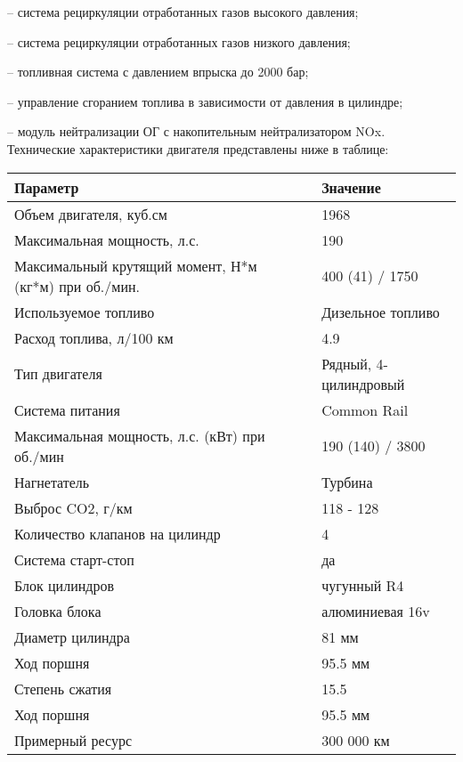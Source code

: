  -- система рециркуляции отработанных газов высокого давления;
 
 -- система рециркуляции отработанных газов низкого давления;
 
 -- топливная система с давлением впрыска до 2000 бар;
 
 -- управление сгоранием топлива в зависимости от давления в цилиндре;
 
 -- модуль нейтрализации ОГ с накопительным нейтрализатором NOx.\\
 
Технические характеристики двигателя представлены ниже в таблице:
 
 \begin{center}
 	\begin{tabulary}{\textwidth}{LCL}
 		\hline 
 		\textbf{Параметр}      &   & \textbf{Значение}\\
 		\hline    
 		Объем двигателя, куб.см     &   &    	1968\\
 		Максимальная мощность, л.с.   &   &    	190 \\
 	Максимальный крутящий момент, Н*м (кг*м) при об./мин. & & 400 (41) / 1750 \\
 		Используемое топливо & &    Дизельное топливо\\
 		Расход топлива, л/100 км   & &     4.9\\
 		Тип двигателя   & &    Рядный, 4-цилиндровый\\
 	Система питания  & &    Common Rail\\
 	Максимальная мощность, л.с. (кВт) при об./мин   & &    190 (140) / 3800\\
 		Нагнетатель   & &     Турбина\\
 		Выброс CO2, г/км   & &     118 - 128\\
 		Количество клапанов на цилиндр  & &    4\\
 				Система старт-стоп   & &     да\\
 				Блок цилиндров   &   &    	чугунный R4 \\
 						Головка блока   &   &    	алюминиевая 16v \\
 						Диаметр цилиндра   &   &    81 мм \\
 						Ход поршня  &   &    95.5 мм \\
 							Степень сжатия &   &    15.5\\
 								Ход поршня  &   &    95.5 мм \\
 								Примерный ресурс  &   &    300 000 км \\
 	\end{tabulary}  
 \end{center}
  
